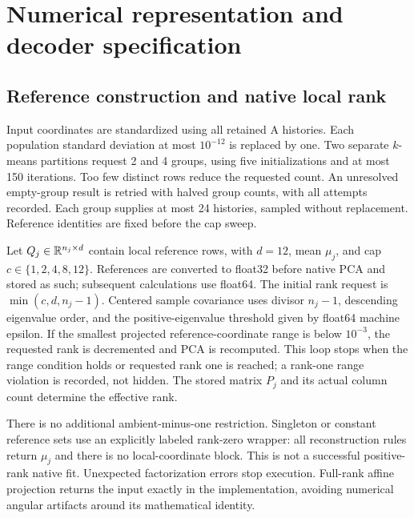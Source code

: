 \section{Numerical representation and decoder specification}\label{sup:method}
\subsection{Reference construction and native local rank}
Input coordinates are standardized using all retained A histories. Each population standard deviation at most $10^{-12}$ is replaced by one. Two separate $k$-means partitions request 2 and 4 groups, using five initializations and at most 150 iterations. Too few distinct rows reduce the requested count. An unresolved empty-group result is retried with halved group counts, with all attempts recorded. Each group supplies at most 24 histories, sampled without replacement. Reference identities are fixed before the cap sweep.

Let $Q_j\in\mathbb R^{n_j\times d}$ contain local reference rows, with $d=12$, mean $\mu_j$, and cap $c\in\{1,2,4,8,12\}$. References are converted to float32 before native PCA and stored as such; subsequent calculations use float64. The initial rank request is $\min(c,d,n_j-1)$. Centered sample covariance uses divisor $n_j-1$, descending eigenvalue order, and the positive-eigenvalue threshold given by float64 machine epsilon. If the smallest projected reference-coordinate range is below $10^{-3}$, the requested rank is decremented and PCA is recomputed. This loop stops when the range condition holds or requested rank one is reached; a rank-one range violation is recorded, not hidden. The stored matrix $P_j$ and its actual column count determine the effective rank.

There is no additional ambient-minus-one restriction. Singleton or constant reference sets use an explicitly labeled rank-zero wrapper: all reconstruction rules return $\mu_j$ and there is no local-coordinate block. This is not a successful positive-rank native fit. Unexpected factorization errors stop execution. Full-rank affine projection returns the input exactly in the implementation, avoiding numerical angular artifacts around its mathematical identity.

